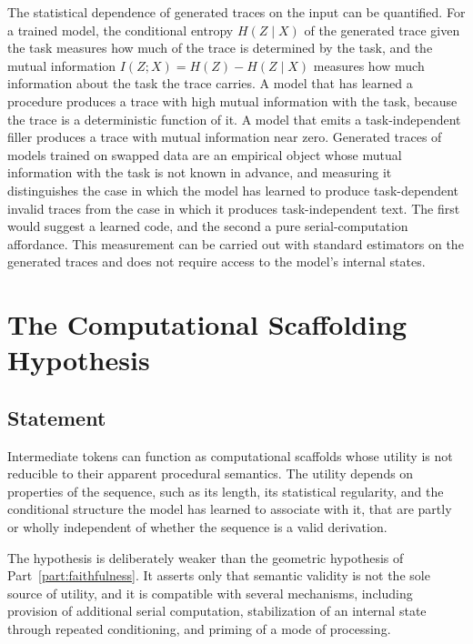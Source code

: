 The statistical dependence of generated traces on the input can be quantified. For a trained model, the conditional entropy $H(Z\mid X)$ of the generated trace given the task measures how much of the trace is determined by the task, and the mutual information $I(Z;X)=H(Z)-H(Z\mid X)$ measures how much information about the task the trace carries. A model that has learned a procedure produces a trace with high mutual information with the task, because the trace is a deterministic function of it. A model that emits a task-independent filler produces a trace with mutual information near zero. Generated traces of models trained on swapped data are an empirical object whose mutual information with the task is not known in advance, and measuring it distinguishes the case in which the model has learned to produce task-dependent invalid traces from the case in which it produces task-independent text. The first would suggest a learned code, and the second a pure serial-computation affordance.
This measurement can be carried out with standard estimators on the generated traces and does not require access to the model's internal states.

\chapter{The Computational Scaffolding Hypothesis}
\label{ch:scaffolding}

\section{Statement}

\begin{hypothesis}\label{hyp:scaffold}
Intermediate tokens can function as computational scaffolds whose utility is not reducible to their apparent procedural semantics. The utility depends on properties of the sequence, such as its length, its statistical regularity, and the conditional structure the model has learned to associate with it, that are partly or wholly independent of whether the sequence is a valid derivation.
\end{hypothesis}

The hypothesis is deliberately weaker than the geometric hypothesis of Part~\ref{part:faithfulness}. It asserts only that semantic validity is not the sole source of utility, and it is compatible with several mechanisms, including provision of additional serial computation, stabilization of an internal state through repeated conditioning, and priming of a mode of processing.

